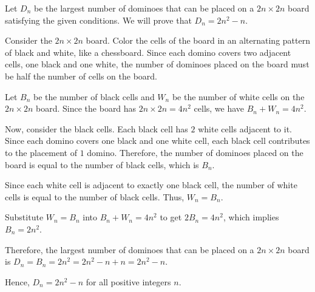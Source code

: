 Let $D_n$ be the largest number of dominoes that can be placed on a $2n \times 2n$ board satisfying the given conditions. We will prove that $D_n = 2n^2 - n$.

Consider the $2n \times 2n$ board. Color the cells of the board in an alternating pattern of black and white, like a chessboard. Since each domino covers two adjacent cells, one black and one white, the number of dominoes placed on the board must be half the number of cells on the board.

Let $B_n$ be the number of black cells and $W_n$ be the number of white cells on the $2n \times 2n$ board. Since the board has $2n \times 2n = 4n^2$ cells, we have $B_n + W_n = 4n^2$.

Now, consider the black cells. Each black cell has $2$ white cells adjacent to it. Since each domino covers one black and one white cell, each black cell contributes to the placement of $1$ domino. Therefore, the number of dominoes placed on the board is equal to the number of black cells, which is $B_n$.

Since each white cell is adjacent to exactly one black cell, the number of white cells is equal to the number of black cells. Thus, $W_n = B_n$.

Substitute $W_n = B_n$ into $B_n + W_n = 4n^2$ to get $2B_n = 4n^2$, which implies $B_n = 2n^2$.

Therefore, the largest number of dominoes that can be placed on a $2n \times 2n$ board is $D_n = B_n = 2n^2 = 2n^2 - n + n = 2n^2 - n$. 

Hence, $D_n = 2n^2 - n$ for all positive integers $n$.
